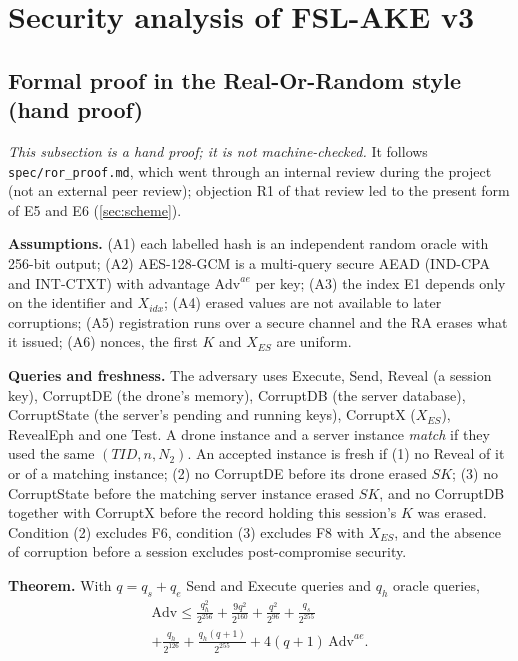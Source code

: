 \section{Security analysis of FSL-AKE v3}\label{sec:security}

\subsection{Formal proof in the Real-Or-Random style (hand proof)}\label{sec:ror}
\emph{This subsection is a hand proof; it is not machine-checked.} It follows \texttt{spec/ror\_proof.md}, which went through
an internal review during the project (not an external peer review); objection R1 of that review led to the present form of
E5 and E6 (\cref{sec:scheme}).

\textbf{Assumptions.} (A1) each labelled hash is an independent random oracle with 256-bit output; (A2) AES-128-GCM is a
multi-query secure AEAD (IND-CPA and INT-CTXT) with advantage $\mathrm{Adv}^{ae}$ per key; (A3) the index E1 depends only on
the identifier and $X_{idx}$; (A4) erased values are not available to later corruptions; (A5) registration runs over a secure
channel and the RA erases what it issued; (A6) nonces, the first $K$ and $X_{ES}$ are uniform.

\textbf{Queries and freshness.} The adversary uses \textsf{Execute}, \textsf{Send}, \textsf{Reveal} (a session key),
\textsf{CorruptDE} (the drone's memory), \textsf{CorruptDB} (the server database), \textsf{CorruptState} (the server's
pending and running keys), \textsf{CorruptX} ($X_{ES}$), \textsf{RevealEph} and one \textsf{Test}. A drone instance and a
server instance \emph{match} if they used the same $(TID, n, N_2)$. An accepted instance is fresh if (1) no \textsf{Reveal}
of it or of a matching instance; (2) no \textsf{CorruptDE} before its drone erased $SK$; (3) no \textsf{CorruptState} before the
matching server instance erased $SK$, and no \textsf{CorruptDB} together with \textsf{CorruptX} before the record holding this
session's $K$ was erased. Condition (2) excludes F6, condition (3) excludes F8 with $X_{ES}$, and the absence of corruption
before a session excludes post-compromise security.

\textbf{Theorem.} With $q = q_s + q_e$ \textsf{Send} and \textsf{Execute} queries and $q_h$ oracle queries,
\begin{multline*}
\mathrm{Adv} \le \frac{q_h^2}{2^{256}} + \frac{9q^2}{2^{160}} + \frac{q^2}{2^{96}} + \frac{q_s}{2^{255}} \\ + \frac{q_h}{2^{126}}
 + \frac{q_h(q+1)}{2^{255}} + 4(q+1)\,\mathrm{Adv}^{ae}.
\end{multline*}

